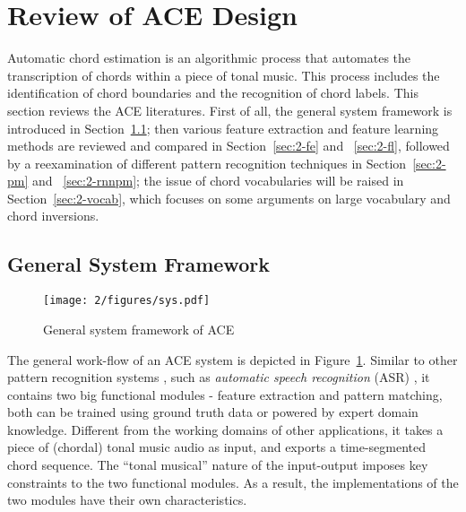 \newpage
\section{Review of ACE Design} \label{sec:2-review}
Automatic chord estimation is an algorithmic process that automates the transcription of chords within a piece of tonal music. This process includes the identification of chord boundaries and the recognition of chord labels. This section reviews the ACE literatures. First of all, the general system framework is introduced in Section~\ref{sec:2-sys}; then various feature extraction and feature learning methods are reviewed and compared in Section~\ref{sec:2-fe} and ~\ref{sec:2-fl}, followed by a reexamination of different pattern recognition techniques in Section~\ref{sec:2-pm} and ~\ref{sec:2-rnnpm}; the issue of chord vocabularies will be raised in Section~\ref{sec:2-vocab}, which focuses on some arguments on large vocabulary and chord inversions.


\subsection{General System Framework} \label{sec:2-sys}

\begin{figure}[htb]
\centering
\texttt{[image: 2/figures/sys.pdf]}
\caption{General system framework of ACE}
\label{fig:2-sys}
\end{figure}

The general work-flow of an ACE system is depicted in Figure~\ref{fig:2-sys}. Similar to other pattern recognition systems \cite{duda2012pattern}, such as \textit{automatic speech recognition} (ASR) \cite{huang2001spoken}, it contains two big functional modules - feature extraction and pattern matching, both can be trained using ground truth data or powered by expert domain knowledge. Different from the working domains of other applications, it takes a piece of (chordal) tonal music audio as input, and exports a time-segmented chord sequence. The ``tonal musical'' nature of the input-output imposes key constraints to the two functional modules. As a result, the implementations of the two modules have their own characteristics.


